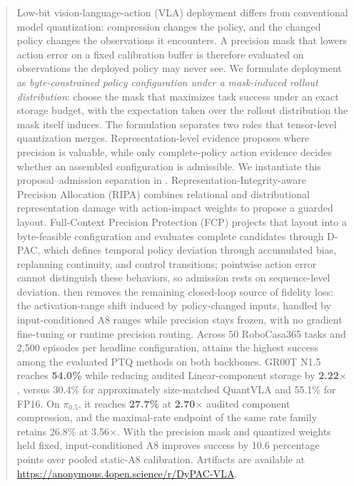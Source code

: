 \begin{abstract}
Low-bit vision-language-action (VLA) deployment differs from conventional model quantization: compression changes the policy, and the changed policy changes the observations it encounters. A precision mask that lowers action error on a fixed calibration buffer is therefore evaluated on observations the deployed policy may never see. We formulate deployment as \emph{byte-constrained policy configuration under a mask-induced rollout distribution}: choose the mask that maximizes task success under an exact storage budget, with the expectation taken over the rollout distribution the mask itself induces. The formulation separates two roles that tensor-level quantization merges. Representation-level evidence proposes where precision is valuable, while only complete-policy action evidence decides whether an assembled configuration is admissible. We instantiate this proposal--admission separation in \method. Representation-Integrity-aware Precision Allocation (RIPA) combines relational and distributional representation damage with action-impact weights to propose a guarded layout. Full-Context Precision Protection (FCP) projects that layout into a byte-feasible configuration and evaluates complete candidates through D-PAC, which defines temporal policy deviation through accumulated bias, replanning continuity, and control transitions; pointwise action error cannot distinguish these behaviors, so admission rests on sequence-level deviation. \dyrange then removes the remaining closed-loop source of fidelity loss: the activation-range shift induced by policy-changed inputs, handled by input-conditioned A8 ranges while precision stays frozen, with no gradient fine-tuning or runtime precision routing. Across 50 RoboCasa365 tasks and 2,500 episodes per headline configuration, \method attains the highest success among the evaluated PTQ methods on both backbones. GR00T N1.5 reaches \textbf{54.0\%} while reducing audited Linear-component storage by \textbf{2.22$\times$}, versus 30.4\% for approximately size-matched QuantVLA and 55.1\% for FP16. On $\pi_{0.5}$, it reaches \textbf{27.7\%} at \textbf{2.70$\times$} audited component compression, and the maximal-rate endpoint of the same rate family retains 26.8\% at 3.56$\times$. With the precision mask and quantized weights held fixed, input-conditioned A8 improves success by 10.6 percentage points over pooled static-A8 calibration. Artifacts are available at \url{https://anonymous.4open.science/r/DyPAC-VLA}.
\end{abstract}
